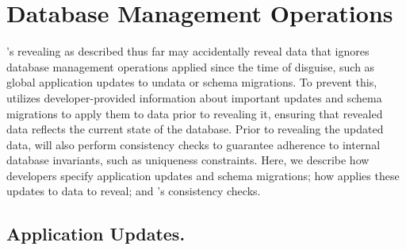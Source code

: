 \section{Database Management Operations}
\label{s:design:database-updates}
\sys's revealing as described thus far may accidentally reveal data that ignores
database management operations applied since the time of disguise, such as
global application updates to un\xxed data or schema migrations.
%
To prevent this, \sys utilizes developer-provided information about important
updates and schema migrations to apply them to \xxed data prior to revealing it,
ensuring that revealed data reflects the current state of the database.
%
Prior to revealing the updated data, \sys will also perform consistency checks
to guarantee adherence to internal database invariants, such as uniqueness
constraints.
%
Here, we describe how developers specify application updates and schema
migrations; how \sys applies these updates to data to reveal; and \sys's
consistency checks.

%
\subsection{Application Updates.}
\label{s:design:updates}

